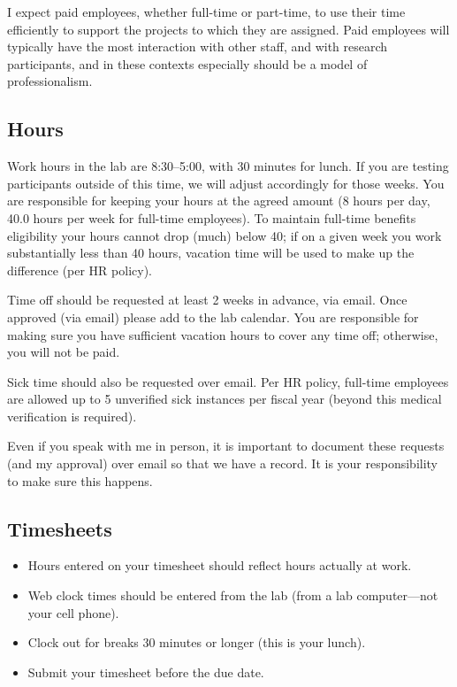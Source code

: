 \documentclass[letterpaper,12pt,oneside]{memoir}
\begin{document}
I expect paid employees, whether full-time or part-time, to use their time efficiently to support the projects to which they are assigned. Paid employees will typically have the most interaction with other staff, and with research participants, and in these contexts especially should be a model of professionalism.

\subsection{Hours}
Work hours in the lab are 8:30--5:00, with 30 minutes for lunch. If you are testing participants outside of this time, we will adjust accordingly for those weeks. You are responsible for keeping your hours at the agreed amount (8 hours per day, 40.0 hours per week for full-time employees). To maintain full-time benefits eligibility your hours cannot drop (much) below 40; if on a given week you work substantially less than 40 hours, vacation time will be used to make up the difference (per HR policy).

Time off should be requested at least 2 weeks in advance, via email. Once approved (via email) please add to the lab calendar. You are responsible for making sure you have sufficient vacation hours to cover any time off; otherwise, you will not be paid.

Sick time should also be requested over email. Per HR policy, full-time employees are allowed up to 5 unverified sick instances per fiscal year (beyond this medical verification is required).

\begin{shaded}
\noindent Even if you speak with me in person, it is important to document these requests (and my approval) over email so that we have a record. It is your responsibility to make sure this happens.
\end{shaded}

\subsection{Timesheets}

\begin{itemize}
\item Hours entered on your timesheet should reflect hours actually at work.
\item Web clock times should be entered from the lab (from a lab computer---not your cell phone).
\item Clock out for breaks 30 minutes or longer (this is your lunch).
\item Submit your timesheet before the due date.
\end{itemize}
\end{document}
